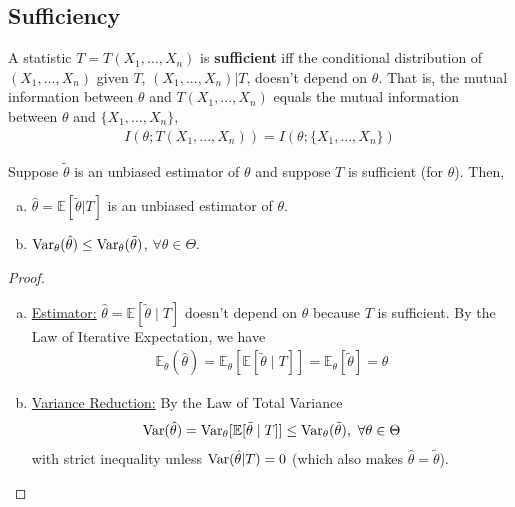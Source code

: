 \documentclass[11pt]{elegantbook}
\begin{document}
\subsection{Sufficiency}
\begin{definition}
    \normalfont
    A statistic $T=T(X_1,...,X_n)$ is \textbf{sufficient} iff the conditional distribution of $(X_1,...,X_n)$ given $T$, $(X_1,...,X_n)|T$, doesn't depend on $\theta$. That is, the mutual information between $\theta$ and $T(X_1,...,X_n)$ equals the mutual information between $\theta$ and $\{X_1,...,X_n\}$,
    \begin{equation}
        \begin{aligned}
            I(\theta;T(X_1,...,X_n))=I(\theta;\{X_1,...,X_n\})
        \end{aligned}
        \nonumber
    \end{equation}
\end{definition}

\begin{theorem}
    \normalfont
    Suppose $\tilde{\theta}$ is an unbiased estimator of $\theta$ and suppose $T$ is sufficient (for $\theta$). Then,
    \begin{enumerate}[(a).]
        \item $\hat{\theta}=\mathbb{E}[\tilde{\theta}|T]$ is an unbiased estimator of $\theta$.
        \item $\textnormal{Var}_\theta(\hat{\theta})\leq \textnormal{Var}_\theta(\tilde{\theta})$, $\forall \theta\in\Theta$.
    \end{enumerate}
\end{theorem}
\begin{proof}
    \begin{enumerate}[(a).]
        \item \underline{Estimator:} $\hat{\theta}=\mathbb{E}[\tilde{\theta}\mid T]$ doesn't depend on $\theta$ because $T$ is sufficient. By the Law of Iterative Expectation, we have
        \begin{equation}
            \begin{aligned}
                \mathbb{E}_\theta(\hat{\theta})=\mathbb{E}_\theta[\mathbb{E}[\tilde{\theta}\mid T]]=\mathbb{E}_\theta[\tilde{\theta}]=\theta
            \end{aligned}
            \nonumber
        \end{equation}
        \item \underline{Variance Reduction:} By the Law of Total Variance
        \begin{equation}
            \begin{aligned}
                \textnormal{Var}(\hat{\theta})=\textnormal{Var}_\theta[\mathbb{E}[\tilde{\theta}\mid T]]\leq \textnormal{Var}_\theta(\tilde{\theta}),\ \forall \theta\in \Theta
            \end{aligned}
            \nonumber
        \end{equation}
        with strict inequality unless $\textnormal{Var}(\hat{\theta}|T)=0$ (which also makes $\hat{\theta}=\tilde{\theta}$).
    \end{enumerate}
\end{proof}
\end{document}
